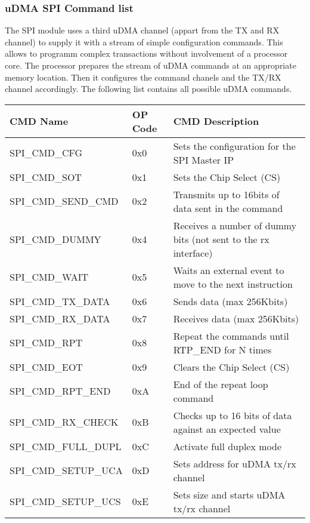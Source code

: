 \subsubsection{uDMA SPI Command list}
The SPI module uses a third uDMA channel (appart from the TX and RX channel) to
supply it with a stream of simple configuration commands.
This allows to programm complex transactions without involvement of a processor
core.
The processor prepares the stream of uDMA commands at an appropriate memory
location.
Then it configures the command chanels and the TX/RX channel accordingly.
The following list contains all possible uDMA commands.
{\small
  \begin{tabularx}{\textwidth}{|l|l|l|}
      \hline
      \textbf{CMD Name} & \textbf{OP Code}  & \textbf{CMD Description} \\
      \hline
      SPI\_CMD\_CFG       	& 0x0 & Sets the configuration for the SPI Master IP \\
      SPI\_CMD\_SOT       	& 0x1 & Sets the Chip Select (CS) \\
      SPI\_CMD\_SEND\_CMD  	& 0x2 & Transmits up to 16bits of data sent in the command \\
      SPI\_CMD\_DUMMY     	& 0x4 & Receives a number of dummy bits (not sent to the rx interface) \\
      SPI\_CMD\_WAIT      	& 0x5 & Waits an external event to move to the next instruction \\
      SPI\_CMD\_TX\_DATA   	& 0x6 & Sends data (max 256Kbits) \\
      SPI\_CMD\_RX\_DATA   	& 0x7 & Receives data (max 256Kbits) \\
      SPI\_CMD\_RPT       	& 0x8 & Repeat the commands until RTP\_END for N times \\
      SPI\_CMD\_EOT       	& 0x9 & Clears the Chip Select (CS) \\
      SPI\_CMD\_RPT\_END   	& 0xA & End of the repeat loop command \\
      SPI\_CMD\_RX\_CHECK  	& 0xB & Checks up to 16 bits of data against an expected value \\
      SPI\_CMD\_FULL\_DUPL 	& 0xC & Activate full duplex mode \\
      SPI\_CMD\_SETUP\_UCA 	& 0xD & Sets address for uDMA tx/rx channel \\
      SPI\_CMD\_SETUP\_UCS 	& 0xE & Sets size and starts uDMA tx/rx channel \\
      \hline
  \end{tabularx}
}

